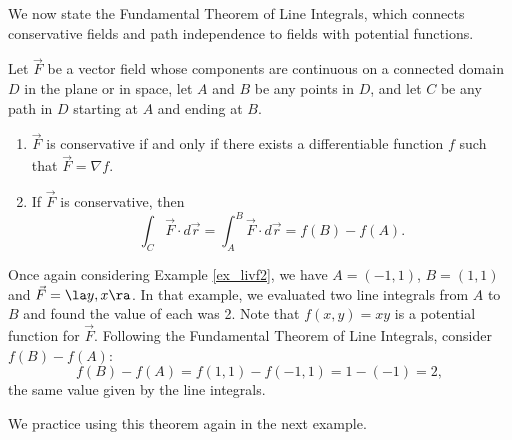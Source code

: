 We now state the Fundamental Theorem of Line Integrals, which connects conservative fields and path independence to fields with potential functions. 

{Let $\vec F$ be a vector field whose components are continuous on a connected domain $D$ in the plane or in space, let $A$ and $B$ be any points in $D$, and let $C$ be any path in $D$ starting at $A$ and ending at $B$.
\begin{enumerate}
	\item $\vec F$ is conservative if and only if there exists a differentiable function $f$ such that $\vec F = \nabla f$. 
	\item	If $\vec F$ is conservative, then 
	\[
	\int_C\vec F\cdot d\vec r = \int_A^B \vec F\cdot d\vec r = f(B) - f(A).
	\]
\end{enumerate}
}

Once again considering Example \ref{ex_livf2}, we have $A = (-1,1)$, $B = (1,1)$ and $\vec F = \la y,x\ra$. In that example, we evaluated two line integrals from $A$ to $B$ and found the value of each was 2. Note that $f(x,y) = xy$ is a potential function for $\vec F$. Following the Fundamental Theorem of Line Integrals, consider $f(B) - f(A)$:
\[
f(B) - f(A) = f(1,1) - f(-1,1) = 1 - (-1) = 2,
\]
the same value given by the line integrals.

\enlargethispage{\baselineskip}
We practice using this theorem again in the next example.\\

